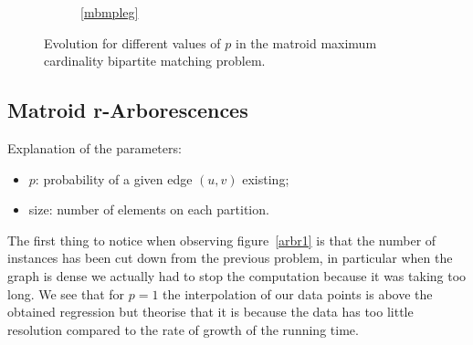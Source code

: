 \documentclass[a4,11pt]{article}
\begin{document}
\begin{figure}[ht]
\begin{subfigure}[b]{0.5\textwidth}
    \centering
\end{subfigure}
\begin{subfigure}[b]{0.5\textwidth}
\end{subfigure}

\begin{subfigure}[b]{\textwidth}
    \centering
	\ref{mbmpleg}
\end{subfigure}
\caption{Evolution for different values of $p$ in the matroid maximum cardinality bipartite matching problem.} \label{mbmr2}
\end{figure}

\subsection{Matroid r-Arborescences}
Explanation of the parameters:
\begin{itemize}
    \setlength\itemsep{-.1em}
    \item $p$: probability of a given edge $(u,v)$ existing;
    \item size: number of elements on each partition.
\end{itemize}

The first thing to notice when observing figure~\ref{arbr1} is that the number of instances has been cut down from the previous problem, in particular when the graph is dense we actually had to stop the computation because it was taking too long. We see that for $p = 1$ the interpolation of our data points is above the obtained regression but theorise that it is because the data has too little resolution compared to the rate of growth of the running time.
\end{document}
